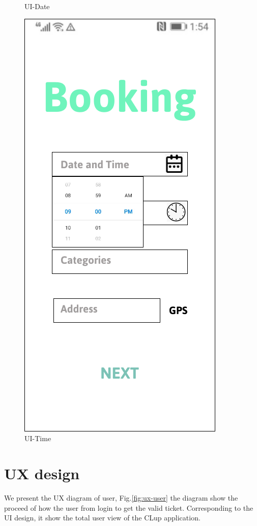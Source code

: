 \documentclass[a4paper,12pt]{report}
\begin{document}
\begin{figure}[H]
\begin{minipage}[t]{0.56\linewidth}
		\caption{UI-Date}
		\label{fig:UI-Date}
	\end{minipage}%
	\begin{minipage}[t]{0.56\linewidth}
		\centering
		\includegraphics[scale=0.5]{UI-Time.png}
		\caption{UI-Time}
		\label{fig:UI-Time}
	\end{minipage}
\end{figure}





\section{UX design}
We present the UX diagram of user, Fig.\ref{fig:ux-user} the diagram show the proceed of how the user from login to get the valid ticket. Corresponding to the UI design, it show the total user view of the CLup application.~\\
\end{document}
